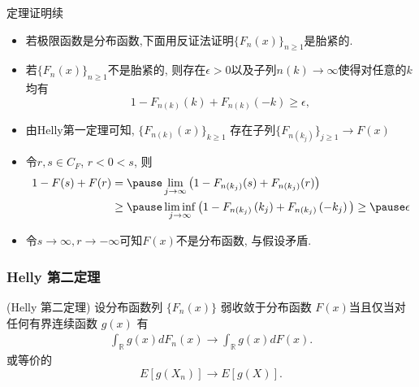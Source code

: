 \begin{frame}{定理证明续}
	\begin{itemize}[<+-|alert@+>]
	\item 若极限函数是分布函数,下面用反证法证明$\{F_n(x)\}_{n\geq 1}$是胎紧的.
	\item 若$\{F_n(x)\}_{n\geq 1}$不是胎紧的, 则存在$\epsilon>0$以及子列$n(k)\rightarrow\infty$使得对任意的$k$均有 \pause
	\[
		1-F_{n(k)}(k)+F_{n(k)}(-k) \geq \epsilon,
		\]
		\item 由Helly第一定理可知, $\{F_{n(k)}(x)\}_{k\geq 1}$ 存在子列$\{F_{n\left(k_{j}\right)}\}_{j\geq 1}\rightarrow F(x)$
		\item 令$r, s\in C_F$, $r<0<s$, 则
	\begin{align*}
		1-F(s)+F(r)  &=\pause \lim _{j \rightarrow \infty} \big(1-F_{n\left(k_{j}\right)}(s)+F_{n\left(k_{j}\right)}(r)\big)
		 \\
		&\geq \pause \liminf _{j \rightarrow \infty} \big(1-F_{n\left(k_{j}\right)}\left(k_{j}\right)+F_{n\left(k_{j}\right)}\left(-k_{j}\right)\big) \geq \pause \epsilon
	\end{align*}
\item 令$s \rightarrow \infty, r \rightarrow-\infty$可知$F(x)$不是分布函数, 与假设矛盾. %
	\end{itemize}

\end{frame}

\begin{frame}
	\frametitle{{\rm Helly} 第二定理}
	\begin{thm}
		({\rm Helly} 第二定理) 设分布函数列 $\{F_n(x)\}$ 弱收敛于分布函数 $F (x)$当且仅当对任何有界连续函数 $g(x)$ 有
		\begin{eqnarray*}
			\int_{\mathbb{R}}g(x)dF_n(x)\rightarrow\int_{\mathbb{R}}g(x)dF(x).
		\end{eqnarray*}
		或等价的\pause
		\[E[g(X_n)]\rightarrow E[g(X)].\]
	\end{thm}

\end{frame}


